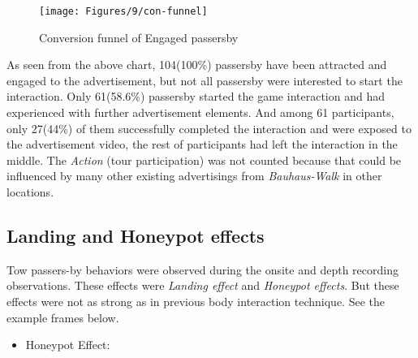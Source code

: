 \begin{figure}[H]
    \centering
    \texttt{[image: Figures/9/con-funnel]}
    \caption{Conversion funnel of Engaged passersby}%
    \label{fig:bodyengagedpasserbypercentage}%
\end{figure}


As seen from the above chart, 104(100\%) passersby have been attracted and engaged to the advertisement, but not all passersby were interested to start the interaction. Only 61(58.6\%) passersby started the game interaction and had experienced with further advertisement elements. And among 61 participants, only 27(44\%) of them successfully completed the interaction and were exposed to the advertisement video, the rest of participants had left the interaction in the middle. The \emph{Action} (tour participation) was not counted because that could be influenced by many other existing advertisings from \emph{Bauhaus-Walk} in other locations.



\subsection{Landing and Honeypot effects}
Tow passers-by behaviors were observed during the onsite and depth recording observations. These effects were \emph{Landing effect}\cite{LookingGlass} and \emph{Honeypot effects}\cite{EnticingPeople}. But these effects were not as strong as in previous body interaction technique. See the example frames below.



\begin{itemize}


\item Honeypot Effect:

\end{itemize}


